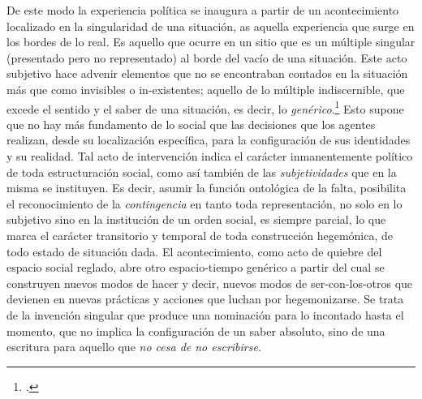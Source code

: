 De este modo la experiencia política se inaugura a partir de un acontecimiento localizado en la singularidad de una situación, as aquella experiencia que surge en los bordes de lo real. Es aquello que ocurre en un sitio que es un múltiple singular (presentado pero no representado) al borde del vacío de una situación. Este acto subjetivo hace advenir elementos que no se encontraban contados en la situación más que como invisibles o in-existentes; aquello de lo múltiple indiscernible, que excede el sentido y el saber de una situación, es decir, lo \emph{genérico}.\footcite[]{@7072-BADIOU2002} Esto supone que no hay más fundamento de lo social que las decisiones que los agentes realizan, desde su localización específica, para la configuración de sus identidades y su realidad. Tal acto de intervención indica el carácter inmanentemente político de toda estructuración social, como así también de las \emph{subjetividades} que en la misma se instituyen. Es decir, asumir la función ontológica de la falta, posibilita el reconocimiento de la \emph{contingencia} en tanto toda representación, no solo en lo subjetivo sino en la institución de un orden social, es siempre parcial, lo que marca el carácter transitorio y temporal de toda construcción hegemónica, de todo estado de situación dada. El acontecimiento, como acto de quiebre del espacio social reglado, abre otro espacio-tiempo genérico a partir del cual se construyen nuevos modos de hacer y decir, nuevos modos de ser-con-los-otros que devienen en nuevas prácticas y acciones que luchan por hegemonizarse. Se trata de la invención singular que produce una nominación para lo incontado hasta el momento, que no implica la configuración de un saber absoluto, sino de una escritura para aquello que \emph{no cesa de no escribirse}.

